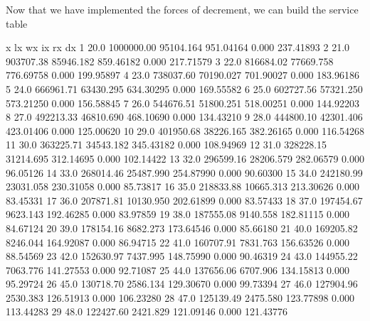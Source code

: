 \documentclass{article}
\begin{document}
Now that we have implemented the forces of decrement, we can build the service table
\begin{Schunk}
\begin{Soutput}
      x         lx        wx        ix        rx        dx
1  20.0 1000000.00 95104.164 951.04164     0.000 237.41893
2  21.0  903707.38 85946.182 859.46182     0.000 217.71579
3  22.0  816684.02 77669.758 776.69758     0.000 199.95897
4  23.0  738037.60 70190.027 701.90027     0.000 183.96186
5  24.0  666961.71 63430.295 634.30295     0.000 169.55582
6  25.0  602727.56 57321.250 573.21250     0.000 156.58845
7  26.0  544676.51 51800.251 518.00251     0.000 144.92203
8  27.0  492213.33 46810.690 468.10690     0.000 134.43210
9  28.0  444800.10 42301.406 423.01406     0.000 125.00620
10 29.0  401950.68 38226.165 382.26165     0.000 116.54268
11 30.0  363225.71 34543.182 345.43182     0.000 108.94969
12 31.0  328228.15 31214.695 312.14695     0.000 102.14422
13 32.0  296599.16 28206.579 282.06579     0.000  96.05126
14 33.0  268014.46 25487.990 254.87990     0.000  90.60300
15 34.0  242180.99 23031.058 230.31058     0.000  85.73817
16 35.0  218833.88 10665.313 213.30626     0.000  83.45331
17 36.0  207871.81 10130.950 202.61899     0.000  83.57433
18 37.0  197454.67  9623.143 192.46285     0.000  83.97859
19 38.0  187555.08  9140.558 182.81115     0.000  84.67124
20 39.0  178154.16  8682.273 173.64546     0.000  85.66180
21 40.0  169205.82  8246.044 164.92087     0.000  86.94715
22 41.0  160707.91  7831.763 156.63526     0.000  88.54569
23 42.0  152630.97  7437.995 148.75990     0.000  90.46319
24 43.0  144955.22  7063.776 141.27553     0.000  92.71087
25 44.0  137656.06  6707.906 134.15813     0.000  95.29724
26 45.0  130718.70  2586.134 129.30670     0.000  99.73394
27 46.0  127904.96  2530.383 126.51913     0.000 106.23280
28 47.0  125139.49  2475.580 123.77898     0.000 113.44283
29 48.0  122427.60  2421.829 121.09146     0.000 121.43776

\end{Soutput}
\end{Schunk}
\end{document}
